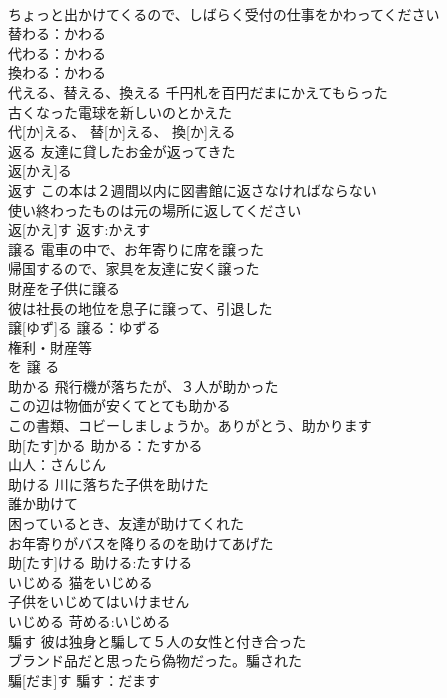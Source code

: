 \documentclass[8pt]{extreport}
\begin{document}
\begin{CJK}{UTF8}{min}
\\	ちょっと出かけてくるので、しばらく受付の仕事をかわってください 
\\	替わる：かわる
\\	代わる：かわる
\\	換わる：かわる
\\	代える、替える、換える	千円札を百円だまにかえてもらった 
\\	古くなった電球を新しいのとかえた 
\\	代[か]える、 替[か]える、 換[か]える						
\\	返る	友達に貸したお金が返ってきた 
\\	返[かえ]る			
\\	返す	この本は２週間以内に図書館に返さなければならない 
\\	使い終わったものは元の場所に返してください 
\\	返[かえ]す			返す:かえす
\\	譲る	電車の中で、お年寄りに席を譲った 
\\	帰国するので、家具を友達に安く譲った 
\\	財産を子供に譲る 
\\	彼は社長の地位を息子に譲って、引退した 
\\	譲[ゆず]る			譲る：ゆずる
\\	権利・財産等 
\\	を 譲 る 
\\	助かる	飛行機が落ちたが、３人が助かった 
\\	この辺は物価が安くてとても助かる 
\\	この書類、コビーしましょうか。ありがとう、助かります 
\\	助[たす]かる			助かる：たすかる
\\	山人：さんじん
\\	助ける	川に落ちた子供を助けた 
\\	誰か助けて 
\\	困っているとき、友達が助けてくれた 
\\	お年寄りがバスを降りるのを助けてあげた 
\\	助[たす]ける			助ける:たすける
\\	いじめる	猫をいじめる 
\\	子供をいじめてはいけません 
\\	いじめる			苛める:いじめる
\\	騙す	彼は独身と騙して５人の女性と付き合った 
\\	ブランド品だと思ったら偽物だった。騙された 
\\	騙[だま]す			騙す：だます

\end{CJK}
\end{document}
